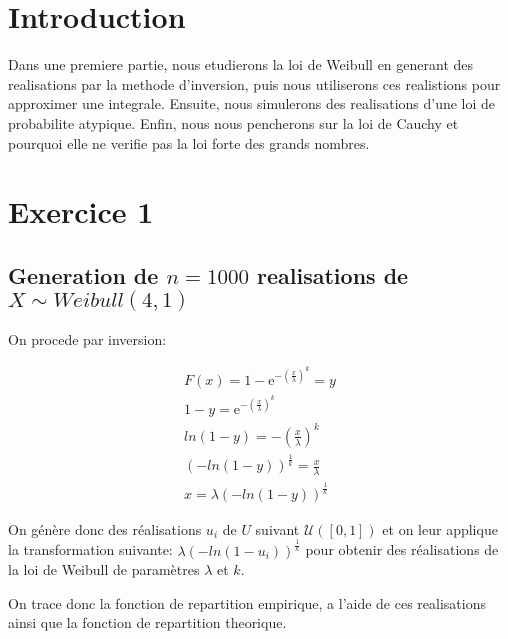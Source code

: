 \documentclass{article}
\begin{document}
\begin{multicols}{2}

\section{Introduction}\label{sec:intro}

Dans une premiere partie, nous etudierons la loi de Weibull en generant des
realisations par la methode d'inversion, puis nous utiliserons ces realistions
pour approximer une integrale. Ensuite, nous simulerons des realisations d'une
loi de probabilite atypique. Enfin, nous nous pencherons sur la loi de Cauchy
et pourquoi elle ne verifie pas la loi forte des grands nombres.


\section{Exercice 1}\label{sec:ex1}

\subsection{Generation de $n = 1000$ realisations de $X \sim Weibull(4, 1)$}\label{subsec:ex11}

On procede par inversion:

\begin{equation}
    \begin{multlined}
        F(x) = 1 - \mathrm{e}^{-\left({\frac{x}{\lambda}}\right)^k} = y \\
        1 - y = \mathrm{e}^{-\left({\frac{x}{\lambda}}\right)^k} \\
        ln(1 - y) = -\left(\frac{x}{\lambda}\right)^k \\
        (-ln(1 - y))^{\frac{1}{k}} = \frac{x}{\lambda} \\
        x = \lambda (-ln(1 - y))^{\frac{1}{k}}
    \end{multlined}
\end{equation}

On génère donc des réalisations $u_i$ de $U$ suivant $\mathcal{U}([0, 1])$ et on
leur applique la transformation suivante: $\lambda (-ln(1 - u_i))^{\frac{1}{k}}$
pour obtenir des réalisations de la loi de Weibull de paramètres $\lambda$ et
$k$.

On trace donc la fonction de repartition empirique, a l'aide de ces realisations
ainsi que la fonction de repartition theorique.


\end{multicols}
\end{document}
